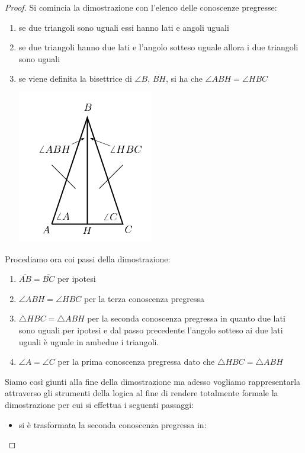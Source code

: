 \documentclass[a4paper]{report}
\begin{document}
\begin{proof}
Si comincia la dimostrazione con l'elenco delle conoscenze pregresse: 
\begin{enumerate}
\item se due triangoli sono uguali essi hanno lati e angoli uguali
\item se due triangoli hanno due lati e l'angolo sotteso uguale allora i due triangoli sono uguali
\item se viene definita la bisettrice di $\angle B$, $\overline{BH}$, si ha che $\angle ABH = \angle HBC$
\begin{center}
\includegraphics[scale=0.5]{img/tri2.png}
\end{center}
\end{enumerate}
Procediamo ora coi passi della dimostrazione:
\begin{enumerate}
\item $\overline{AB}=\overline{BC}$ per ipotesi
\item $\angle ABH = \angle HBC$ per la terza conoscenza pregressa
\item $\triangle HBC = \triangle ABH$ per la seconda conoscenza pregressa in quanto due lati sono uguali per ipotesi e dal passo precedente
      l'angolo sotteso ai due lati uguali è uguale in ambedue i triangoli.
\item $\angle A= \angle C$ per la prima conoscenza pregressa dato che $\triangle HBC = \triangle ABH$ 
\end{enumerate}
Siamo così giunti alla fine della dimostrazione ma adesso vogliamo rappresentarla attraverso gli strumenti della logica al fine di rendere
totalmente formale la dimostrazione per cui si effettua i seguenti passaggi:
\begin{itemize}
\item si è trasformata la seconda conoscenza pregressa in:\newline

\end{itemize}
\end{proof}
\end{document}
